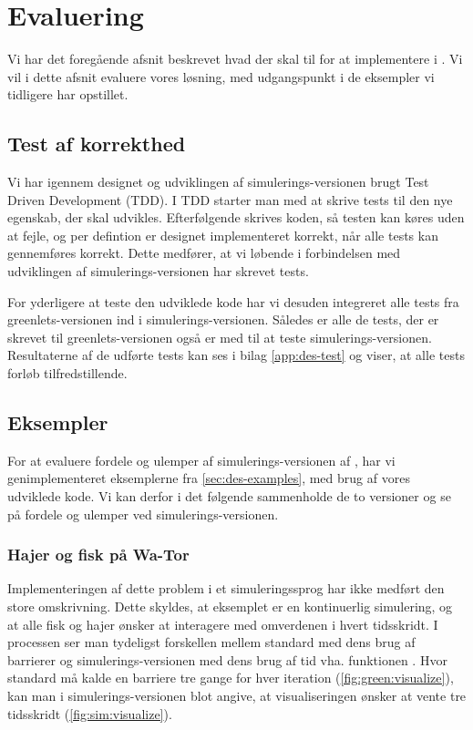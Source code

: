 \section{Evaluering}
\label{sec:des-eval}
Vi har  det foregående afsnit beskrevet hvad der skal til for at implementere \des i \pycsp. Vi vil i dette afsnit evaluere vores løsning, med udgangspunkt i de eksempler vi tidligere har opstillet. 
\subsection{Test af korrekthed}
  Vi har igennem designet og udviklingen af simulerings-versionen brugt Test Driven Development (TDD). I TDD starter man med at skrive tests til den nye egenskab, der skal udvikles. Efterfølgende skrives koden, så testen kan køres uden at fejle, og per defintion er designet implementeret korrekt, når alle tests kan gennemføres korrekt. Dette medfører, at vi løbende i forbindelsen med udviklingen af simulerings-versionen har skrevet tests. 
  
For yderligere at teste den udviklede kode har vi desuden integreret alle tests fra greenlets-versionen ind i simulerings-versionen. Således er alle de tests, der er skrevet til greenlets-versionen også er med til at teste simulerings-versionen. Resultaterne af de udførte tests kan ses i bilag \ref{app:des-test} og viser, at alle tests forløb tilfredstillende.
  
\subsection{Eksempler}
For at evaluere fordele og ulemper af simulerings-versionen af \pycsp, har vi genimplementeret eksemplerne fra \cref{sec:des-examples}, med  brug af vores udviklede kode. Vi kan derfor i det følgende sammenholde de to versioner og se på fordele og ulemper ved simulerings-versionen.
 
\subsubsection{Hajer og fisk på Wa-Tor}
Implementeringen af dette problem  i et simuleringssprog har ikke medført den store omskrivning. Dette skyldes, at eksemplet er en kontinuerlig simulering, og at alle fisk og hajer ønsker at interagere med omverdenen i hvert tidsskridt. I processen  ser man tydeligst forskellen mellem standard \pycsp med dens brug af barrierer og simulerings-versionen med dens brug af tid vha. funktionen . Hvor standard \pycsp må kalde en barriere tre gange for hver iteration (\cref{fig:green:visualize}), kan man i simulerings-versionen blot angive, at visualiseringen ønsker at vente tre tidsskridt (\cref{fig:sim:visualize}). 

